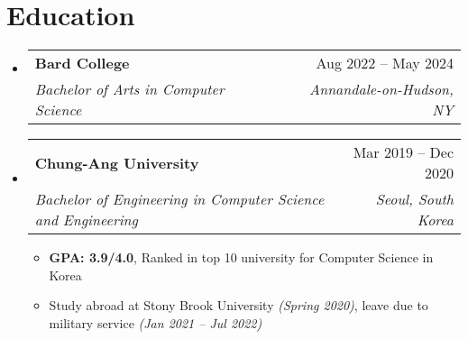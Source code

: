 \documentclass[letterpaper,11pt]{article}
\makeatletter
\newcommand{\resumeItem}[1]{
  \item\small{
    {#1 \vspace{-2pt}}
  }
}
\newcommand{\resumeSubheading}[4]{
  \item
    \begin{tabular*}{0.98\textwidth}[t]{l@{\extracolsep{\fill}}r}
      \textbf{#1} & #2 \\
      \textit{\small#3} & \textit{\small #4} \\
    \end{tabular*}\vspace{-6pt}
}
\newcommand{\resumeSubHeadingListStart}{\begin{itemize}[leftmargin=0.1in, label={}]}
\newcommand{\resumeSubHeadingListEnd}{\end{itemize}}
\newcommand{\resumeItemListStart}{\begin{itemize}[leftmargin=0.25in]}
\newcommand{\resumeItemListEnd}{\end{itemize}\vspace{-5.5pt}}
\makeatother
\begin{document}
\section{Education}
  \resumeSubHeadingListStart
    \resumeSubheading
      {Bard College}{Aug 2022 -- May 2024}
      {Bachelor of Arts in Computer Science}{Annandale-on-Hudson, NY}
    \resumeSubheading
      {Chung-Ang University}{Mar 2019 -- Dec 2020}
      {Bachelor of Engineering in Computer Science and Engineering}{Seoul, South Korea}
      \resumeItemListStart
        \resumeItem{\textbf{GPA: 3.9/4.0}, Ranked in top 10 university for Computer Science in Korea}
        \resumeItem{Study abroad at Stony Brook University \textit{(Spring 2020)}, leave due to military service \textit{(Jan 2021 -- Jul 2022)}}
      \resumeItemListEnd
  \resumeSubHeadingListEnd

\end{document}

